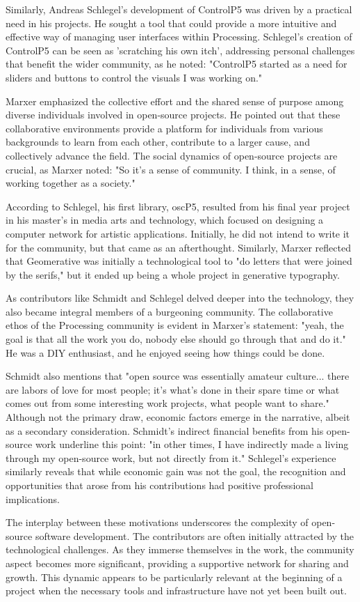 Similarly, Andreas Schlegel's development of ControlP5 was driven by a practical need in his projects. He sought a tool that could provide a more intuitive and effective way of managing user interfaces within Processing. Schlegel's creation of ControlP5 can be seen as 'scratching his own itch', addressing personal challenges that benefit the wider community, as he noted: "ControlP5 started as a need for sliders and buttons to control the visuals I was working on."

Marxer emphasized the collective effort and the shared sense of purpose among diverse individuals involved in open-source projects. He pointed out that these collaborative environments provide a platform for individuals from various backgrounds to learn from each other, contribute to a larger cause, and collectively advance the field. The social dynamics of open-source projects are crucial, as Marxer noted: "So it's a sense of community. I think, in a sense, of working together as a society."

According to Schlegel, his first library, oscP5, resulted from his final year project in his master's in media arts and technology, which focused on designing a computer network for artistic applications. Initially, he did not intend to write it for the community, but that came as an afterthought. Similarly, Marxer reflected that Geomerative was initially a technological tool to "do letters that were joined by the serifs," but it ended up being a whole project in generative typography.

As contributors like Schmidt and Schlegel delved deeper into the technology, they also became integral members of a burgeoning community. The collaborative ethos of the Processing community is evident in Marxer's statement: "yeah, the goal is that all the work you do, nobody else should go through that and do it." He was a DIY enthusiast, and he enjoyed seeing how things could be done. 

Schmidt also mentions that "open source was essentially amateur culture... there are labors of love for most people; it's what's done in their spare time or what comes out from some interesting work projects, what people want to share." Although not the primary draw, economic factors emerge in the narrative, albeit as a secondary consideration. Schmidt's indirect financial benefits from his open-source work underline this point: "in other times, I have indirectly made a living through my open-source work, but not directly from it." Schlegel's experience similarly reveals that while economic gain was not the goal, the recognition and opportunities that arose from his contributions had positive professional implications.

The interplay between these motivations underscores the complexity of open-source software development. The contributors are often initially attracted by the technological challenges. As they immerse themselves in the work, the community aspect becomes more significant, providing a supportive network for sharing and growth. This dynamic appears to be particularly relevant at the beginning of a project when the necessary tools and infrastructure have not yet been built out.


